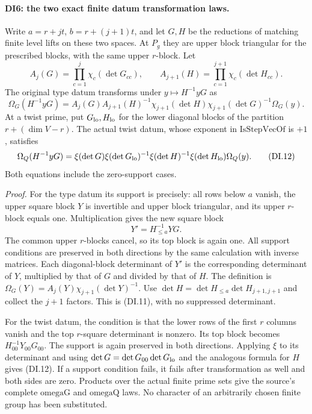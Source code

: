 \paragraph{DI6: the two exact finite datum transformation laws.}
\label{claim:DI6}
Write \(a=r+jt\), \(b=r+(j+1)t\), and let \(G,H\) be the
reductions of matching finite level lifts on these two spaces. At
\(P_g\) they are upper block triangular for the prescribed blocks,
with the same upper \(r\)-block. Let
\[
 A_j(G)=\prod_{c=1}^{j}\chi_c(\det G_{cc}),\qquad
 A_{j+1}(H)=\prod_{c=1}^{j+1}\chi_c(\det H_{cc}).
\]
The original type datum transforms under \(y\mapsto H^{-1}yG\) as
\[
 \Omega_G(H^{-1}yG)=
  A_j(G)A_{j+1}(H)^{-1}
  \chi_{j+1}(\det H)\chi_{j+1}(\det G)^{-1}\Omega_G(y).
 \tag{DI.11}
\]
At a twist prime, put \(G_{\rm lo},H_{\rm lo}\) for the lower
diagonal blocks of the partition \(r+(\dim V-r)\). The actual
twist datum, whose exponent in \(\mathrm{IsStepVecOf}\) is \(+1\),
satisfies
\[
 \Omega_Q(H^{-1}yG)=
 \xi(\det G)\xi(\det G_{\rm lo})^{-1}
 \xi(\det H)^{-1}\xi(\det H_{\rm lo})\Omega_Q(y).
 \tag{DI.12}
\]
Both equations include the zero-support cases.

\emph{Proof.}
For the type datum its support is precisely: all rows below \(a\)
vanish, the upper square block \(Y\) is invertible and upper block
triangular, and its upper \(r\)-block equals one. Multiplication
gives the new square block
\[
                       Y'=H_{\le a}^{-1}YG .
 \tag{DI.13}
\]
The common upper \(r\)-blocks cancel, so its top block is again one.
All support conditions are preserved in both directions by the same
calculation with inverse matrices. Each diagonal-block determinant
of \(Y'\) is the corresponding determinant of \(Y\), multiplied
by that of \(G\) and divided by that of \(H\). The definition is
\(\Omega_G(Y)=A_j(Y)\chi_{j+1}(\det Y)^{-1}\).
Use
\(\det H=\det H_{\le a}\det H_{j+1,j+1}\) and collect the
\(j+1\) factors. This is (DI.11), with no suppressed determinant.

For the twist datum, the condition is that the lower rows of the
first \(r\) columns vanish and the top \(r\)-square determinant
is nonzero. Its top block becomes \(H_{00}^{-1}Y_{00}G_{00}\).
The support is again preserved in both directions. Applying \(\xi\)
to its determinant and using
\(\det G=\det G_{00}\det G_{\rm lo}\) and the analogous formula
for \(H\) gives (DI.12). If a support condition fails, it fails
after transformation as well and both sides are zero. Products over
the actual finite prime sets give the source's complete
\(\mathrm{omegaG}\) and \(\mathrm{omegaQ}\) laws. No character
of an arbitrarily chosen finite group has been substituted.

